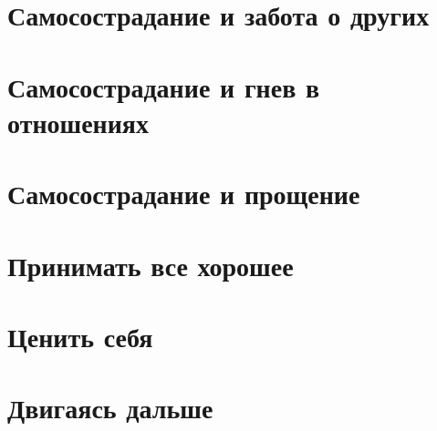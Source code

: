 \documentclass[a4paper,12pt]{report}
\begin{document}
\chapter{Самосострадание и забота о других}
\chapter{Самосострадание и гнев в отношениях}
\chapter{Самосострадание и прощение}
\chapter{Принимать все хорошее}
\chapter{Ценить себя}
\chapter{Двигаясь дальше}
\end{document}
